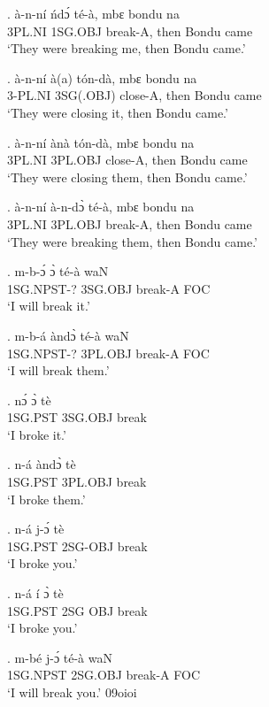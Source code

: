 \documentclass{assets/fieldnotes}
\begin{document}
\exg.
à-n-ní     ńdɔ́       té-à,      mbɛ    bondu   na   \\
3PL.NI   1SG.OBJ   break-A,   then   Bondu   came \\%
`They were breaking me, then Bondu came.'

\exg.
à-n-ní     à(a)        tón-dà,    mbɛ    bondu   na   \\
3-PL.NI   3SG(.OBJ)   close-A,   then   Bondu   came \\%
`They were closing it, then Bondu came.'\label{28222}

\exg.
à-n-ní     ànà       tón-dà,    mbɛ    bondu   na   \\
3PL.NI   3PL.OBJ   close-A,   then   Bondu   came \\%
`They were closing them, then Bondu came.'

\exg.
à-n-ní     à-n-dɔ̀      té-à,      mbɛ    bondu   na   \\
3PL.NI   3PL.OBJ   break-A,   then   Bondu   came \\%
`They were breaking them, then Bondu came.'

\exg.
m-b-ɔ́        ɔ̀         té-à      waN \\
1SG.NPST-?   3SG.OBJ   break-A   FOC \\%
`I will break it.'

\exg.
m-b-á        àndɔ̀      té-à      waN \\
1SG.NPST-?   3PL.OBJ   break-A   FOC \\%
`I will break them.'

\exg.
nɔ́        ɔ̀         tè    \\
1SG.PST   3SG.OBJ   break \\%
`I broke it.'

\exg.
n-á        àndɔ̀      tè    \\
1SG.PST   3PL.OBJ   break \\%
`I broke them.'

\exg.
n-á        j-ɔ́        tè    \\
1SG.PST   2SG-OBJ   break \\%
`I broke you.'


\exg.
n-á        í     ɔ̀     tè    \\
1SG.PST   2SG   OBJ   break \\%
`I broke you.' \label{14438}

\exg.
m-bé        j-ɔ́        té-à      waN \\
1SG.NPST   2SG.OBJ   break-A   FOC \\%
`I will break you.'
09oioi
\end{document}
